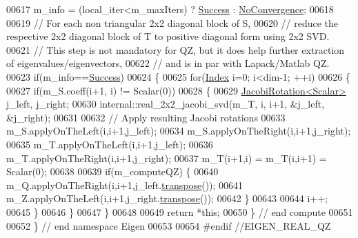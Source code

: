 \begin{DoxyCode}
00617       m\_info = (local\_iter<m\_maxIters) ? \hyperlink{group__enums_gga85fad7b87587764e5cf6b513a9e0ee5ea52581b035f4b59c203b8ff999ef5fcea}{Success} : \hyperlink{group__enums_gga85fad7b87587764e5cf6b513a9e0ee5eaba1c8763d1179778070f365ecc4157a8}{NoConvergence};
00618 
00619       \textcolor{comment}{// For each non triangular 2x2 diagonal block of S,}
00620       \textcolor{comment}{//    reduce the respective 2x2 diagonal block of T to positive diagonal form using 2x2 SVD.}
00621       \textcolor{comment}{// This step is not mandatory for QZ, but it does help further extraction of
       eigenvalues/eigenvectors,}
00622       \textcolor{comment}{// and is in par with Lapack/Matlab QZ.}
00623       \textcolor{keywordflow}{if}(m\_info==\hyperlink{group__enums_gga85fad7b87587764e5cf6b513a9e0ee5ea52581b035f4b59c203b8ff999ef5fcea}{Success})
00624       \{
00625         \textcolor{keywordflow}{for}(\hyperlink{group___eigenvalues___module_a6201e534e901b5f4e66f72c176b534a3}{Index} i=0; i<dim-1; ++i)
00626         \{
00627           \textcolor{keywordflow}{if}(m\_S.coeff(i+1, i) != Scalar(0))
00628           \{
00629             \hyperlink{group___jacobi___module_class_eigen_1_1_jacobi_rotation}{JacobiRotation<Scalar>} j\_left, j\_right;
00630             internal::real\_2x2\_jacobi\_svd(m\_T, i, i+1, &j\_left, &j\_right);
00631 
00632             \textcolor{comment}{// Apply resulting Jacobi rotations}
00633             m\_S.applyOnTheLeft(i,i+1,j\_left);
00634             m\_S.applyOnTheRight(i,i+1,j\_right);
00635             m\_T.applyOnTheLeft(i,i+1,j\_left);
00636             m\_T.applyOnTheRight(i,i+1,j\_right);
00637             m\_T(i+1,i) = m\_T(i,i+1) = Scalar(0);
00638 
00639             \textcolor{keywordflow}{if}(m\_computeQZ) \{
00640               m\_Q.applyOnTheRight(i,i+1,j\_left.\hyperlink{group___jacobi___module_ab40e9cdc4582593511e57ee896e055a2}{transpose}());
00641               m\_Z.applyOnTheLeft(i,i+1,j\_right.\hyperlink{group___jacobi___module_ab40e9cdc4582593511e57ee896e055a2}{transpose}());
00642             \}
00643 
00644             i++;
00645           \}
00646         \}
00647       \}
00648 
00649       \textcolor{keywordflow}{return} *\textcolor{keyword}{this};
00650     \} \textcolor{comment}{// end compute}
00651 
00652 \} \textcolor{comment}{// end namespace Eigen}
00653 
00654 \textcolor{preprocessor}{#endif //EIGEN\_REAL\_QZ}
\end{DoxyCode}
